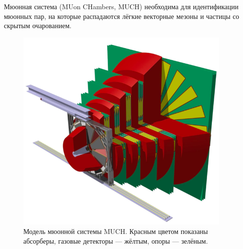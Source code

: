 \begin{minipage}[b]{0.495\textwidth}
Мюонная система (MUon CHambers, MUCH) необходима для идентификации мюонных пар, на которые распадаются лёгкие векторные мезоны и частицы со скрытым очарованием.
\end{minipage}
\begin{minipage}[b]{0.495\textwidth}
\begin{figure}[H]
\includegraphics[width=0.95\textwidth]{pictures/CBM_MUCH_model.png}
\caption{Модель мюонной системы MUCH. Красным цветом показаны абсорберы, газовые детекторы --- жёлтым, опоры --- зелёным.}
\label{fig:MUCH2}
\end{figure}
\end{minipage}

